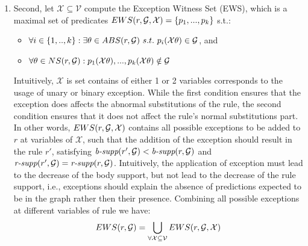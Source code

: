\begin{enumerate}
\item Second, let $\mathcal{X} \subseteq \mathcal{V}$ compute the Exception Witness Set (EWS), which is a maximal set of predicates $EWS(r,\mathcal{G},\mathcal{X}) = \{p_1,...,p_k\}$ s.t.:
\begin{itemize}
\item $\forall i \in \{1,..,k\} : \exists \theta \in ABS(r, \mathcal{G})\ s.t.\ p_i(\mathcal{X}\theta) \in \mathcal{G}$, and 
\item $\forall \theta \in NS(r,\mathcal{G}) :  p_1(\mathcal{X}\theta), ...,p_k(\mathcal{X}\theta) \notin \mathcal{G}$
\end{itemize}
Intuitively, $\mathcal{X}$ is set contains of either 1 or 2 variables corresponds to the usage of unary or binary exception. While the first condition ensures that the exception does affects the abnormal substitutions of the rule, the second condition ensures that it does not affect the rule's normal substitutions part. In other words, $EWS(r,\mathcal{G},\mathcal{X})$ contains all possible exceptions to be added to $r$ at variables of $\mathcal{X}$, such that the addition of the exception should result in the rule $r'$, satisfying $\textit{b-supp}(r', \mathcal{G}) < \textit{b-supp}(r, \mathcal{G})$ and $\textit{r-supp}(r', \mathcal{G}) = \textit{r-supp}(r, \mathcal{G})$. Intuitively, the application of exception must lead to the decrease of the body support, but not lead to the decrease of
the rule support, i.e., exceptions should explain the absence of predictions expected to be in the graph rather then their presence.
Combining all possible exceptions at different variables of rule we have:
\[EWS(r,\mathcal{G}) = \bigcup_{\forall\mathcal{X}\subseteq \mathcal{V}}EWS(r,\mathcal{G},\mathcal{X})\]
\end{enumerate}

